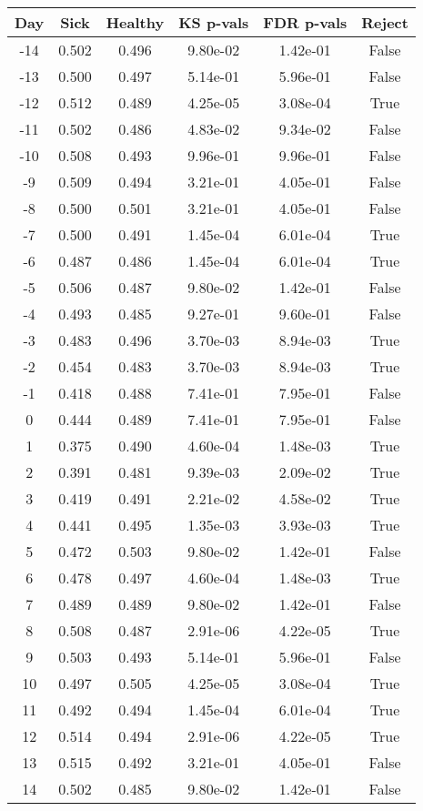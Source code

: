 \begin{tabular}{c|c|c|c|c|c}
Day &  Sick & Healthy &  KS p-vals & FDR p-vals & Reject\\
\hline
-14 & 0.502 &   0.496 &   9.80e-02 &   1.42e-01 &  False\\
-13 & 0.500 &   0.497 &   5.14e-01 &   5.96e-01 &  False\\
-12 & 0.512 &   0.489 &   4.25e-05 &   3.08e-04 &   True\\
-11 & 0.502 &   0.486 &   4.83e-02 &   9.34e-02 &  False\\
-10 & 0.508 &   0.493 &   9.96e-01 &   9.96e-01 &  False\\
 -9 & 0.509 &   0.494 &   3.21e-01 &   4.05e-01 &  False\\
 -8 & 0.500 &   0.501 &   3.21e-01 &   4.05e-01 &  False\\
 -7 & 0.500 &   0.491 &   1.45e-04 &   6.01e-04 &   True\\
 -6 & 0.487 &   0.486 &   1.45e-04 &   6.01e-04 &   True\\
 -5 & 0.506 &   0.487 &   9.80e-02 &   1.42e-01 &  False\\
 -4 & 0.493 &   0.485 &   9.27e-01 &   9.60e-01 &  False\\
 -3 & 0.483 &   0.496 &   3.70e-03 &   8.94e-03 &   True\\
 -2 & 0.454 &   0.483 &   3.70e-03 &   8.94e-03 &   True\\
 -1 & 0.418 &   0.488 &   7.41e-01 &   7.95e-01 &  False\\
  0 & 0.444 &   0.489 &   7.41e-01 &   7.95e-01 &  False\\
  1 & 0.375 &   0.490 &   4.60e-04 &   1.48e-03 &   True\\
  2 & 0.391 &   0.481 &   9.39e-03 &   2.09e-02 &   True\\
  3 & 0.419 &   0.491 &   2.21e-02 &   4.58e-02 &   True\\
  4 & 0.441 &   0.495 &   1.35e-03 &   3.93e-03 &   True\\
  5 & 0.472 &   0.503 &   9.80e-02 &   1.42e-01 &  False\\
  6 & 0.478 &   0.497 &   4.60e-04 &   1.48e-03 &   True\\
  7 & 0.489 &   0.489 &   9.80e-02 &   1.42e-01 &  False\\
  8 & 0.508 &   0.487 &   2.91e-06 &   4.22e-05 &   True\\
  9 & 0.503 &   0.493 &   5.14e-01 &   5.96e-01 &  False\\
 10 & 0.497 &   0.505 &   4.25e-05 &   3.08e-04 &   True\\
 11 & 0.492 &   0.494 &   1.45e-04 &   6.01e-04 &   True\\
 12 & 0.514 &   0.494 &   2.91e-06 &   4.22e-05 &   True\\
 13 & 0.515 &   0.492 &   3.21e-01 &   4.05e-01 &  False\\
 14 & 0.502 &   0.485 &   9.80e-02 &   1.42e-01 &  False\\
\end{tabular}